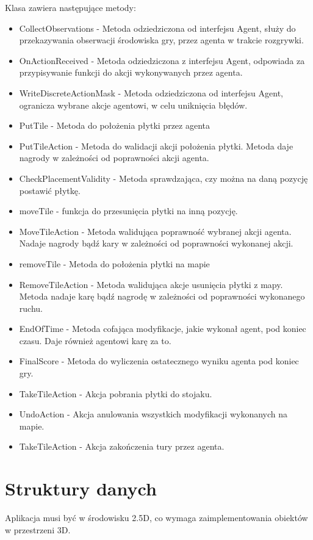 \documentclass[a4paper,twoside,12pt]{book}
\begin{document}
	 Klasa zawiera następujące metody:
	\begin{itemize}
		\item CollectObservations - Metoda odziedziczona od interfejsu Agent, służy do przekazywania obserwacji środowiska gry, przez agenta w trakcie rozgrywki.
		\item OnActionReceived - Metoda odziedziczona z interfejsu Agent, odpowiada za przypisywanie funkcji do akcji wykonywanych przez agenta.
		\item WriteDiscreteActionMask -  Metoda odziedziczona od interfejsu Agent, ogranicza wybrane akcje agentowi, w celu uniknięcia błędów.
		\item PutTile - Metoda do położenia płytki przez agenta
		\item PutTileAction - Metoda do walidacji akcji położenia płytki. Metoda daje nagrody w zależności od poprawności akcji agenta.  
		\item CheckPlacementValidity - Metoda sprawdzająca, czy można na daną pozycję postawić płytkę.
		\item moveTile - funkcja do przesunięcia płytki na inną pozycję.
		\item MoveTileAction - Metoda walidująca poprawność wybranej akcji agenta. Nadaje nagrody bądź kary w zależności od poprawności wykonanej akcji.
		\item removeTile - Metoda do położenia płytki na mapie
		\item RemoveTileAction - Metoda walidująca akcje usunięcia płytki z mapy. Metoda nadaje karę bądź nagrodę w zależności od poprawności wykonanego ruchu.
		\item EndOfTime - Metoda cofająca modyfikacje, jakie wykonał agent, pod koniec czasu. Daje również agentowi karę za to.
		\item FinalScore - Metoda do wyliczenia ostatecznego wyniku agenta pod koniec gry.
		\item TakeTileAction - Akcja pobrania płytki do stojaku.
		\item UndoAction - Akcja anulowania wszystkich modyfikacji wykonanych na mapie.
		\item TakeTileAction - Akcja zakończenia tury przez agenta.
	\end{itemize}
		

	\section{Struktury danych}
	Aplikacja musi być w środowisku 2.5D, co wymaga zaimplementowania obiektów w przestrzeni 3D. 
	
\end{document}
